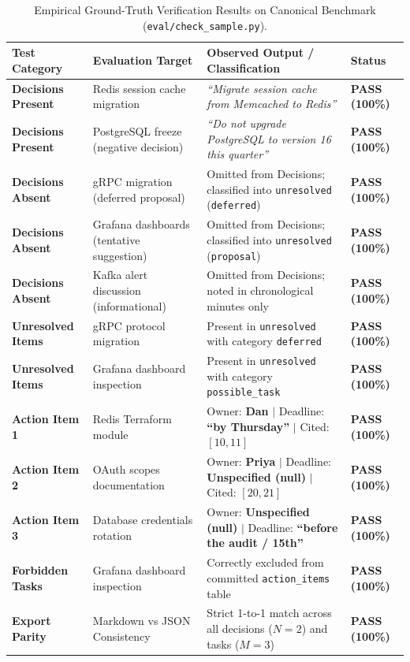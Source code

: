 \documentclass[10pt,a4paper]{article}
\begin{document}
\begin{table}[t]
\centering
\caption{Empirical Ground-Truth Verification Results on Canonical Benchmark (\texttt{eval/check\_sample.py}).}
\label{tab:benchmark_results}
\small
\begin{tabularx}{\textwidth}{l p{4.5cm} X l}
\toprule
\textbf{Test Category} & \textbf{Evaluation Target} & \textbf{Observed Output / Classification} & \textbf{Status} \\
\midrule
\textbf{Decisions Present} & Redis session cache migration & \textit{``Migrate session cache from Memcached to Redis''} & \textbf{\color{passgreen}PASS (100\%)} \\
\textbf{Decisions Present} & PostgreSQL freeze (negative decision) & \textit{``Do not upgrade PostgreSQL to version 16 this quarter''} & \textbf{\color{passgreen}PASS (100\%)} \\
\textbf{Decisions Absent} & gRPC migration (deferred proposal) & Omitted from Decisions; classified into \texttt{unresolved} (\texttt{deferred}) & \textbf{\color{passgreen}PASS (100\%)} \\
\textbf{Decisions Absent} & Grafana dashboards (tentative suggestion) & Omitted from Decisions; classified into \texttt{unresolved} (\texttt{proposal}) & \textbf{\color{passgreen}PASS (100\%)} \\
\textbf{Decisions Absent} & Kafka alert discussion (informational) & Omitted from Decisions; noted in chronological minutes only & \textbf{\color{passgreen}PASS (100\%)} \\
\midrule
\textbf{Unresolved Items} & gRPC protocol migration & Present in \texttt{unresolved} with category \texttt{deferred} & \textbf{\color{passgreen}PASS (100\%)} \\
\textbf{Unresolved Items} & Grafana dashboard inspection & Present in \texttt{unresolved} with category \texttt{possible\_task} & \textbf{\color{passgreen}PASS (100\%)} \\
\midrule
\textbf{Action Item 1} & Redis Terraform module & Owner: \textbf{Dan} $\vert$ Deadline: \textbf{``by Thursday''} $\vert$ Cited: $[10, 11]$ & \textbf{\color{passgreen}PASS (100\%)} \\
\textbf{Action Item 2} & OAuth scopes documentation & Owner: \textbf{Priya} $\vert$ Deadline: \textbf{Unspecified (null)} $\vert$ Cited: $[20, 21]$ & \textbf{\color{passgreen}PASS (100\%)} \\
\textbf{Action Item 3} & Database credentials rotation & Owner: \textbf{Unspecified (null)} $\vert$ Deadline: \textbf{``before the audit / 15th''} & \textbf{\color{passgreen}PASS (100\%)} \\
\textbf{Forbidden Tasks} & Grafana dashboard inspection & Correctly excluded from committed \texttt{action\_items} table & \textbf{\color{passgreen}PASS (100\%)} \\
\midrule
\textbf{Export Parity} & Markdown vs JSON Consistency & Strict 1-to-1 match across all decisions ($N=2$) and tasks ($M=3$) & \textbf{\color{passgreen}PASS (100\%)} \\
\bottomrule
\end{tabularx}
\end{table}
\end{document}
